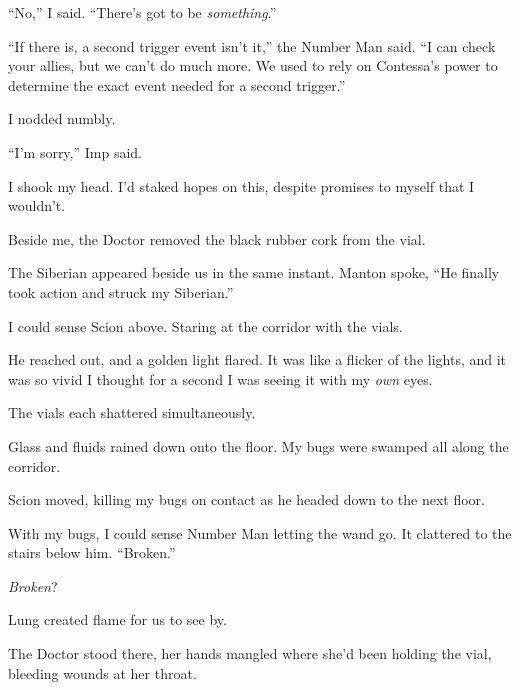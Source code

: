 ``No,'' I said.  ``There's got to be \emph{something}.''



``If there is, a second trigger event isn't it,'' the Number Man said.  ``I can check your allies, but we can't do much more.  We used to rely on Contessa's power to determine the exact event needed for a second trigger.''



I nodded numbly.



``I'm sorry,'' Imp said.



I shook my head.  I'd staked hopes on this, despite promises to myself that I wouldn't.



Beside me, the Doctor removed the black rubber cork from the vial.



The Siberian appeared beside us in the same instant.  Manton spoke, ``He finally took action and struck my Siberian.''



I could sense Scion above.  Staring at the corridor with the vials.



He reached out, and a golden light flared.  It was like a flicker of the lights, and it was so vivid I thought for a second I was seeing it with my \emph{own} eyes.



The vials each shattered simultaneously.



Glass and fluids rained down onto the floor.  My bugs were swamped all along the corridor.



Scion moved, killing my bugs on contact as he headed down to the next floor.



With my bugs, I could sense Number Man letting the wand go.  It clattered to the stairs below him.  ``Broken.''



\emph{Broken}?



Lung created flame for us to see by.



The Doctor stood there, her hands mangled where she'd been holding the vial, bleeding wounds at her throat.



